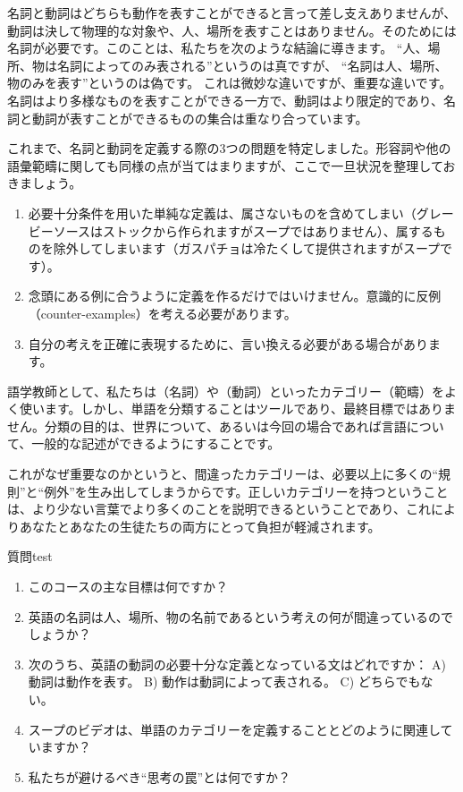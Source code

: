 \bigskip

名詞と動詞はどちらも動作を表すことができると言って差し支えありませんが、動詞は決して物理的な対象や、人、場所を表すことはありません。そのためには名詞が必要です。このことは、私たちを次のような結論に導きます。
\ea
    \ea \enquote{人、場所、物は名詞によってのみ表される}というのは真ですが、
    \ex \enquote{名詞は人、場所、物のみを表す}というのは偽です。
    \z
\z
これは微妙な違いですが、重要な違いです。名詞はより多様なものを表すことができる一方で、動詞はより限定的であり、名詞と動詞が表すことができるものの集合は重なり合っています。

これまで、名詞と動詞を定義する際の3つの問題を特定しました。形容詞や他の語彙範疇に関しても同様の点が当てはまりますが、ここで一旦状況を整理しておきましょう。
\begin{enumerate}[noitemsep]
    \item 必要十分条件を用いた単純な定義は、属さないものを含めてしまい（グレービーソースはストックから作られますがスープではありません）、属するものを除外してしまいます（ガスパチョは冷たくして提供されますがスープです）。
    \item 念頭にある例に合うように定義を作るだけではいけません。意識的に反例（counter-examples）を考える必要があります。
    \item 自分の考えを正確に表現するために、言い換える必要がある場合があります。
\end{enumerate}

語学教師として、私たちは（名詞）や（動詞）といったカテゴリー（範疇）をよく使います。しかし、単語を分類することはツールであり、最終目標ではありません。分類の目的は、世界について、あるいは今回の場合であれば言語について、一般的な記述ができるようにすることです。

これがなぜ重要なのかというと、間違ったカテゴリーは、必要以上に多くの\enquote{規則}と\enquote{例外}を生み出してしまうからです。正しいカテゴリーを持つということは、より少ない言葉でより多くのことを説明できるということであり、これによりあなたとあなたの生徒たちの両方にとって負担が軽減されます。

\bigskip

\begin{tblsframedsymbol}{質問}{test}
\begin{enumerate}[noitemsep, leftmargin=*]
    \item このコースの主な目標は何ですか？
    \item 英語の名詞は人、場所、物の名前であるという考えの何が間違っているのでしょうか？
    \item 次のうち、英語の動詞の必要十分な定義となっている文はどれですか： A) 動詞は動作を表す。 B) 動作は動詞によって表される。 C) どちらでもない。
    \item スープのビデオは、単語のカテゴリーを定義することとどのように関連していますか？
    \item 私たちが避けるべき\enquote{思考の罠}とは何ですか？
\end{enumerate}
\end{tblsframedsymbol}

